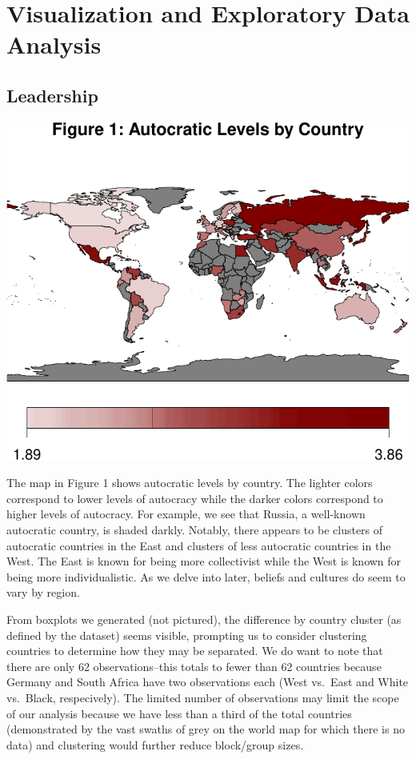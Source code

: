 \documentclass[
]{article}
\begin{document}
\hypertarget{visualization-and-exploratory-data-analysis}{%
\section{Visualization and Exploratory Data
Analysis}\label{visualization-and-exploratory-data-analysis}}

\hypertarget{leadership}{%
\subsection{Leadership}\label{leadership}}

\begin{center}\includegraphics[width=0.95\linewidth]{globe_report_files/figure-latex/leadership-1} \end{center}

The map in Figure 1 shows autocratic levels by country. The lighter
colors correspond to lower levels of autocracy while the darker colors
correspond to higher levels of autocracy. For example, we see that
Russia, a well-known autocratic country, is shaded darkly. Notably,
there appears to be clusters of autocratic countries in the East and
clusters of less autocratic countries in the West. The East is known for
being more collectivist while the West is known for being more
individualistic. As we delve into later, beliefs and cultures do seem to
vary by region.

From boxplots we generated (not pictured), the difference by country
cluster (as defined by the dataset) seems visible, prompting us to
consider clustering countries to determine how they may be separated. We
do want to note that there are only 62 observations--this totals to
fewer than 62 countries because Germany and South Africa have two
observations each (West vs.~East and White vs.~Black, respecively). The
limited number of observations may limit the scope of our analysis
because we have less than a third of the total countries (demonstrated
by the vast swaths of grey on the world map for which there is no data)
and clustering would further reduce block/group sizes.
\end{document}
